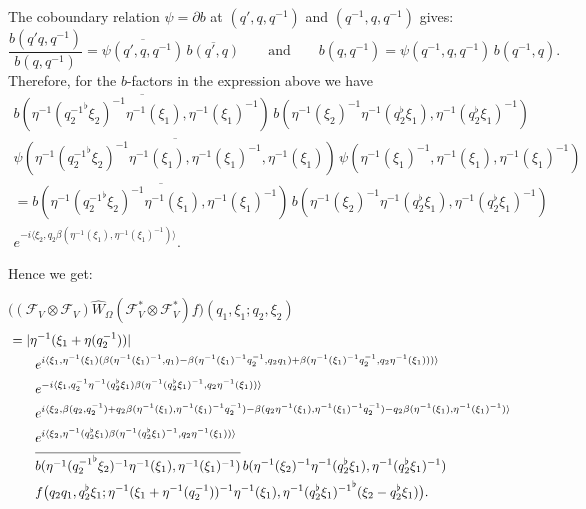 \documentclass[a4paper,11pt,reqno]{amsart}
\numberwithin{equation}{section}
\theoremstyle{remark}
\theoremstyle{definition}
\newcommand{\CF}{\mathcal F}
\begin{document}
The coboundary relation $\psi=\partial b$ at $(q',q,q^{-1})$ and $(q^{-1},q,q^{-1})$ gives:
$$
\frac{b(q'q,q^{-1})}{b(q,q^{-1})}=\overline{\psi(q',q,q^{-1})}\,\overline {b(q',q)}\qquad\mbox{and}\qquad b(q,q^{-1})=\psi(q^{-1},q,q^{-1})\, b(q^{-1},q).
$$
Therefore, for the $b$-factors in the expression above we have
\begin{multline*}
\overline {b(\eta^{-1}({q_2^{-1}}^\flat\xi_2)^{-1}\eta^{-1}(\xi_1),\eta^{-1}(\xi_1)^{-1})}\,
b(\eta^{-1}(\xi_2)^{-1}\eta^{-1}(q_2^\flat\xi_1),\eta^{-1}(q_2^\flat\xi_1)^{-1})
\\
\overline{\psi(\eta^{-1}({q_2^{-1}}^\flat\xi_2)^{-1}\eta^{-1}(\xi_1),\eta^{-1}(\xi_1)^{-1},\eta^{-1}(\xi_1))}\,
\psi(\eta^{-1}(\xi_1)^{-1},\eta^{-1}(\xi_1),\eta^{-1}(\xi_1)^{-1})\\
=\overline {b(\eta^{-1}({q_2^{-1}}^\flat\xi_2)^{-1}\eta^{-1}(\xi_1),\eta^{-1}(\xi_1)^{-1})}\,
b(\eta^{-1}(\xi_2)^{-1}\eta^{-1}(q_2^\flat\xi_1),\eta^{-1}(q_2^\flat\xi_1)^{-1})\\
e^{-i\langle\xi_2,q_2\beta(\eta^{-1}(\xi_1),\eta^{-1}(\xi_1)^{-1})\rangle}.
\end{multline*}

Hence we get:

\medskip
$\displaystyle \big((\CF_V\otimes\CF_V)\hat W_\Omega (\CF_V^*\otimes\CF_V^*)f\big)(q_1,\xi_1;q_2,\xi_2)$
\begin{align}\label{eq:W1}
&=|\eta^{-1}(\xi_1+\eta(q_2^{-1}))|\notag\\
&\qquad  e^{i\langle \xi_1 ,\eta^{-1}(\xi_1)(\beta(\eta^{-1}(\xi_1)^{-1},q_1)-\beta(\eta^{-1}(\xi_1)^{-1}q_2^{-1},q_2q_1)
  +\beta(\eta^{-1}(\xi_1)^{-1}q_2^{-1},q_2\eta^{-1}(\xi_1)))\rangle}\notag\\
&\qquad e^{-i\langle \xi_1 , q_2^{-1}\eta^{-1}(q_2^\flat\xi_1)\beta(\eta^{-1}(q_2^\flat\xi_1)^{-1},q_2\eta^{-1}(\xi_1))\rangle}\notag\\
&\qquad  e^{i\langle \xi_2,\beta(q_2,q_2^{-1})+q_2\beta(\eta^{-1}(\xi_1),\eta^{-1}(\xi_1)^{-1}q_2^{-1})
-\beta(q_2\eta^{-1}(\xi_1),\eta^{-1}(\xi_1)^{-1}q_2^{-1})-q_2\beta(\eta^{-1}(\xi_1),\eta^{-1}(\xi_1)^{-1}) \rangle}\notag\\
&\qquad e^{i\langle \xi_2,\eta^{-1}(q_2^\flat\xi_1)\beta(\eta^{-1}(q_2^\flat\xi_1)^{-1},q_2\eta^{-1}(\xi_1))\rangle}\notag\\
&\qquad\overline {b(\eta^{-1}({q_2^{-1}}^\flat\xi_2)^{-1}\eta^{-1}(\xi_1),\eta^{-1}(\xi_1)^{-1})}\,
b(\eta^{-1}(\xi_2)^{-1}\eta^{-1}(q_2^\flat\xi_1),\eta^{-1}(q_2^\flat\xi_1)^{-1})\notag\\
&\qquad f\big(q_2q_1, q_2^\flat\xi_1 ;\eta^{-1}(\xi_1+\eta^{-1}(q_2^{-1}))^{-1}\eta^{-1}(\xi_1),{\eta^{-1}(q_2^\flat\xi_1)^{-1}}^\flat(\xi_2-q_2^\flat\xi_1)\big).
\end{align}
\end{document}
